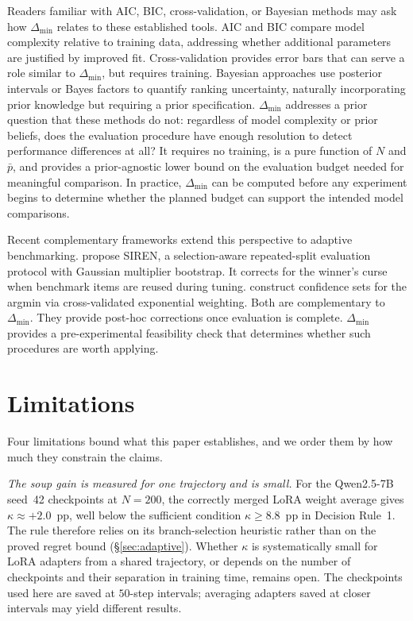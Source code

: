 \documentclass[pdflatex,sn-mathphys-ay,oneside]{sn-jnl}
\theoremstyle{thmstylethree}
\begin{document}
Readers familiar with AIC, BIC, cross-validation, or Bayesian methods may ask how $\Delta_{\min}$ relates to these established tools. AIC and BIC compare model complexity relative to training data, addressing whether additional parameters are justified by improved fit. Cross-validation provides error bars that can serve a role similar to $\Delta_{\min}$, but requires training. Bayesian approaches use posterior intervals or Bayes factors to quantify ranking uncertainty, naturally incorporating prior knowledge but requiring a prior specification. $\Delta_{\min}$ addresses a prior question that these methods do not: regardless of model complexity or prior beliefs, does the evaluation procedure have enough resolution to detect performance differences at all? It requires no training, is a pure function of $N$ and $\bar{p}$, and provides a prior-agnostic lower bound on the evaluation budget needed for meaningful comparison. In practice, $\Delta_{\min}$ can be computed before any experiment begins to determine whether the planned budget can support the intended model comparisons.

Recent complementary frameworks extend this perspective to adaptive benchmarking. \citet{xu2026b} propose SIREN, a selection-aware repeated-split evaluation protocol with Gaussian multiplier bootstrap. It corrects for the winner's curse when benchmark items are reused during tuning. \citet{zhang2024winners} construct confidence sets for the argmin via cross-validated exponential weighting. Both are complementary to $\Delta_{\min}$. They provide post-hoc corrections once evaluation is complete. $\Delta_{\min}$ provides a pre-experimental feasibility check that determines whether such procedures are worth applying.

\section{Limitations}\label{sec:limitations}

Four limitations bound what this paper establishes, and we order them by how much they constrain the claims.

\emph{The soup gain is measured for one trajectory and is small.} For the Qwen2.5-7B seed~42 checkpoints at $N=200$, the correctly merged LoRA weight average gives $\kappa \approx +2.0$~pp, well below the sufficient condition $\kappa \geq 8.8$~pp in Decision Rule~1. The rule therefore relies on its branch-selection heuristic rather than on the proved regret bound (\S\ref{sec:adaptive}). Whether $\kappa$ is systematically small for LoRA adapters from a shared trajectory, or depends on the number of checkpoints and their separation in training time, remains open. The checkpoints used here are saved at $50$-step intervals; averaging adapters saved at closer intervals may yield different results.
\end{document}
